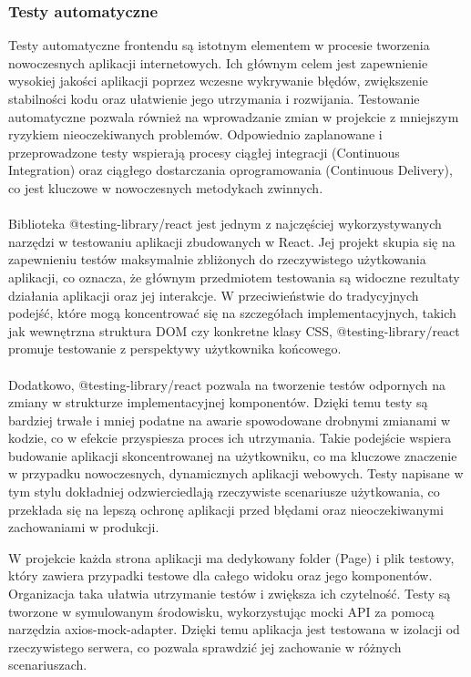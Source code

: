 \documentclass[twoside]{projektInzynierskiMS1}
\begin{document}
\subsubsection{Testy automatyczne}

\noindent
Testy automatyczne frontendu są istotnym elementem w procesie tworzenia nowoczesnych aplikacji internetowych. Ich głównym celem jest zapewnienie wysokiej jakości aplikacji poprzez wczesne wykrywanie błędów, zwiększenie stabilności kodu oraz ułatwienie jego utrzymania i rozwijania. Testowanie automatyczne pozwala również na wprowadzanie zmian w projekcie z mniejszym ryzykiem nieoczekiwanych problemów. Odpowiednio zaplanowane i przeprowadzone testy wspierają procesy ciągłej integracji (Continuous Integration) oraz ciągłego dostarczania oprogramowania (Continuous Delivery), co jest kluczowe w nowoczesnych metodykach zwinnych.
\\\\
Biblioteka @testing-library/react jest jednym z najczęściej wykorzystywanych narzędzi w testowaniu aplikacji zbudowanych w React. Jej projekt skupia się na zapewnieniu testów maksymalnie zbliżonych do rzeczywistego użytkowania aplikacji, co oznacza, że głównym przedmiotem testowania są widoczne rezultaty działania aplikacji oraz jej interakcje. W przeciwieństwie do tradycyjnych podejść, które mogą koncentrować się na szczegółach implementacyjnych, takich jak wewnętrzna struktura DOM czy konkretne klasy CSS, @testing-library/react promuje testowanie z perspektywy użytkownika końcowego.
\\\\
Dodatkowo, @testing-library/react pozwala na tworzenie testów odpornych na zmiany w strukturze implementacyjnej komponentów. Dzięki temu testy są bardziej trwałe i mniej podatne na awarie spowodowane drobnymi zmianami w kodzie, co w efekcie przyspiesza proces ich utrzymania. Takie podejście wspiera budowanie aplikacji skoncentrowanej na użytkowniku, co ma kluczowe znaczenie w przypadku nowoczesnych, dynamicznych aplikacji webowych. Testy napisane w tym stylu dokładniej odzwierciedlają rzeczywiste scenariusze użytkowania, co przekłada się na lepszą ochronę aplikacji przed błędami oraz nieoczekiwanymi zachowaniami w produkcji.

\newpage

\noindent
W projekcie każda strona aplikacji ma dedykowany folder (Page) i plik testowy, który zawiera przypadki testowe dla całego widoku oraz jego komponentów. Organizacja taka ułatwia utrzymanie testów i zwiększa ich czytelność. Testy są tworzone w symulowanym środowisku, wykorzystując mocki API za pomocą narzędzia axios-mock-adapter. Dzięki temu aplikacja jest testowana w izolacji od rzeczywistego serwera, co pozwala sprawdzić jej zachowanie w różnych scenariuszach.
\end{document}
